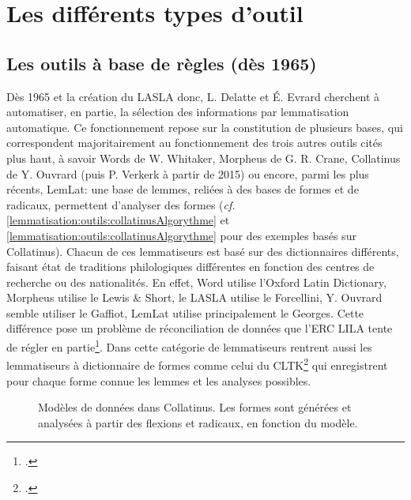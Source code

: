 \section{Les différents types d'outil}

\subsection{Les outils à base de règles (dès 1965)}

Dès 1965 et la création du LASLA donc, L. Delatte et É. Evrard cherchent à automatiser, en partie, la sélection des informations par lemmatisation automatique. Ce fonctionnement repose sur la constitution de plusieurs bases, qui correspondent majoritairement au fonctionnement des trois autres outils cités plus haut, à savoir Words de W. Whitaker, Morpheus de G. R. Crane, Collatinus de Y. Ouvrard (puis P. Verkerk à partir de 2015) ou encore, parmi les plus récents, LemLat: une base de lemmes, reliées à des bases de formes et de radicaux, permettent d'analyser des formes (\textit{cf.} \ref{lemmatisation:outils:collatinusAlgorythme} et \ref{lemmatisation:outils:collatinusAlgorythme} pour des exemples basés sur Collatinus). Chacun de ces lemmatiseurs est basé sur des dictionnaires différents, faisant état de traditions philologiques différentes en fonction des centres de recherche ou des nationalités. En effet, Word utilise l'Oxford Latin Dictionary, Morpheus utilise le Lewis \& Short, le LASLA utilise le Forcellini, Y. Ouvrard semble utiliser le Gaffiot, LemLat utilise principalement le Georges. Cette différence pose un problème de réconciliation de données que l'ERC LILA tente de régler en partie\footcite{mambrini_harmonizing_2019}. Dans cette catégorie de lemmatiseurs rentrent aussi les lemmatiseurs à dictionnaire de formes comme celui du CLTK\footcite{johnson2014cltk} qui enregistrent pour chaque forme connue les lemmes et les analyses possibles.

\begin{figure}[h]
    \centering
    \caption{Modèles de données dans Collatinus. Les formes sont générées et analysées à partir des flexions et radicaux, en fonction du modèle. }
    \label{lemmatisation:outils:collatinusDB}
\end{figure}


